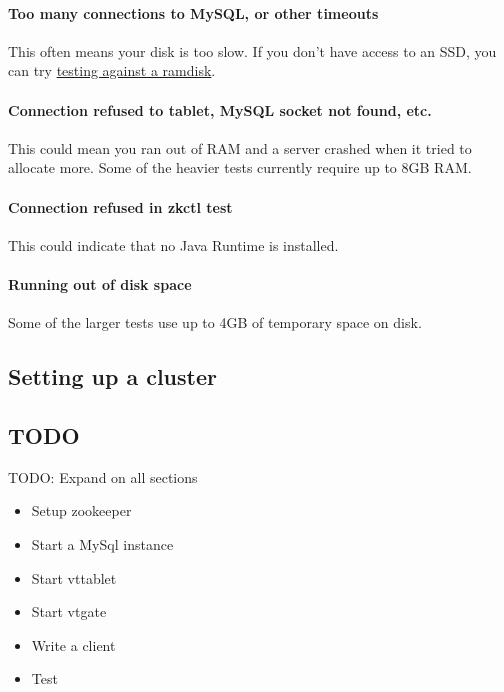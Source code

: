 \paragraph{Too many connections to MySQL, or other timeouts}\hypertarget{too-many-connections-to-mysql-or-other-timeouts}{}\label{too-many-connections-to-mysql-or-other-timeouts}

This often means your disk is too slow. If you don't have access to an SSD,
you can try \href{TestingOnARamDisk.markdown}{testing against a ramdisk}.

\paragraph{Connection refused to tablet, MySQL socket not found, etc.}\hypertarget{connection-refused-to-tablet-mysql-socket-not-found-etc}{}\label{connection-refused-to-tablet-mysql-socket-not-found-etc}

This could mean you ran out of RAM and a server crashed when it tried to allocate more.
Some of the heavier tests currently require up to 8GB RAM.

\paragraph{Connection refused in zkctl test}\hypertarget{connection-refused-in-zkctl-test}{}\label{connection-refused-in-zkctl-test}

This could indicate that no Java Runtime is installed.

\paragraph{Running out of disk space}\hypertarget{running-out-of-disk-space}{}\label{running-out-of-disk-space}

Some of the larger tests use up to 4GB of temporary space on disk.

\subsection{Setting up a cluster}\hypertarget{setting-up-a-cluster}{}\label{setting-up-a-cluster}

\subsection{TODO}\hypertarget{TODO}{}\label{TODO}
TODO: Expand on all sections
\begin{itemize}
\item  Setup zookeeper
\item  Start a MySql instance
\item  Start vttablet
\item  Start vtgate
\item  Write a client
\item  Test
\end{itemize}

